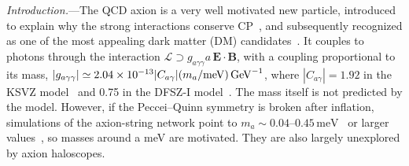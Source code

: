 \documentclass[
  aps,prl,reprint,superscriptaddress,
  amsmath,amssymb,floatfix,nofootinbib
]{revtex4-2}
\newcommand{\meV}{\,\mathrm{meV}}
\newcommand{\gagg}{g_{a\gamma\gamma}}
\begin{document}
\textit{Introduction.}---The QCD axion is a very well motivated new particle, introduced to explain why the strong interactions conserve CP~\cite{Peccei:1977hh,Weinberg:1977ma,Wilczek:1977pj}, and subsequently recognized as one of the most appealing dark matter (DM) candidates~\cite{Preskill:1982cy,Abbott:1982af,Dine:1982ah, OHare:2024nmr, Caputo:2024oqc, Safdi:2022xkm}. It couples to photons through the interaction $\mathcal L\supset\gagg a\,\mathbf E\cdot\mathbf B$, with a coupling proportional to its mass, $|\gagg|\simeq2.04\times10^{-13}|C_{a\gamma}|(m_a/{\rm meV})\,{\rm GeV}^{-1}$, where $|C_{a\gamma}|=1.92$ in the KSVZ model~\cite{Kim:1979if,Shifman:1979if} and 0.75 in the DFSZ-I model~\cite{Dine:1981rt,Zhitnitsky:1980tq,DiLuzio:2020wdo}. The mass itself is not predicted by the model. However, if the Peccei--Quinn symmetry is broken after inflation, simulations of the axion-string network point to $m_a\sim0.04$--$0.45\meV$~\cite{Buschmann:2021sdq,Saikawa:2024bta,Benabou:2024msj} or larger values~\cite{Gorghetto:2020qws}, so masses around a meV are motivated. They are also largely unexplored by axion haloscopes.%
\end{document}

